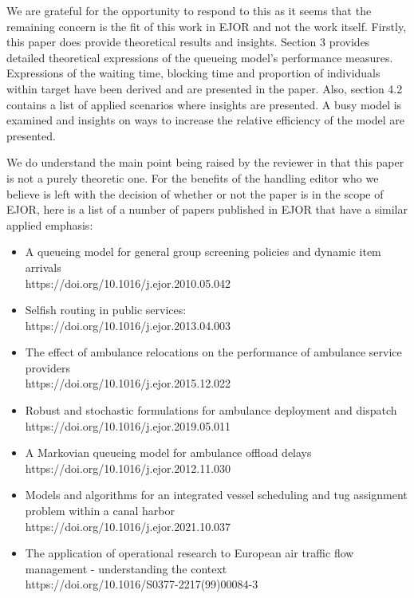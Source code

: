 \documentclass{article}
\begin{document}
    We are grateful for the opportunity to respond to this as it seems that the 
    remaining concern is the fit of this work in EJOR and not the work itself.
    Firstly, this paper does provide theoretical results
    and insights.
    Section 3 provides detailed theoretical expressions of the queueing model's
    performance measures.
    Expressions of the waiting time, blocking time and proportion of
    individuals within target have been derived and are presented in the paper.
    Also, section 4.2 contains a list of applied scenarios where insights 
    are presented.
    A busy model is examined and insights on ways to increase the relative
    efficiency of the model are presented.

    We do understand the main point being raised by the reviewer in that this paper is not a purely theoretic one.
    For the benefits of the handling editor who we believe is left with the decision of whether or not the paper is in the scope of EJOR, here is a list of a number of papers published in EJOR that have a similar applied emphasis:
    \begin{itemize}
        \item A queueing model for general group screening policies and dynamic
        item arrivals \\
        https://doi.org/10.1016/j.ejor.2010.05.042
        \item Selfish routing in public services: \\
        https://doi.org/10.1016/j.ejor.2013.04.003
        \item The effect of ambulance relocations on the performance of
        ambulance service providers \\
        https://doi.org/10.1016/j.ejor.2015.12.022
        \item Robust and stochastic formulations for ambulance deployment and
        dispatch \\
        https://doi.org/10.1016/j.ejor.2019.05.011
        \item A Markovian queueing model for ambulance offload delays \\
        https://doi.org/10.1016/j.ejor.2012.11.030
        \item Models and algorithms for an integrated vessel scheduling and tug
        assignment problem within a canal harbor \\
        https://doi.org/10.1016/j.ejor.2021.10.037
        \item The application of operational research to European air traffic
        flow management - understanding the context \\
        https://doi.org/10.1016/S0377-2217(99)00084-3
    \end{itemize}
    
\end{document}

